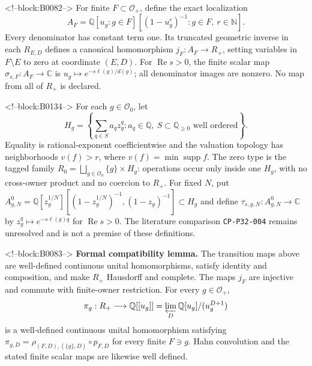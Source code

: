 \documentclass[11pt]{article}
\begin{document}
<!--block:B0082-->
For finite \(F\subset\mathcal O_+\), define the exact localization
\[
 A_F=\mathbb Q[u_g:g\in F]
 [(1-u_g^r)^{-1}:g\in F,\ r\in\mathbb N].
\]
Every denominator has constant term one.  Its truncated geometric inverse in
each \(R_{E,D}\) defines a canonical homomorphism \(j_F:A_F\to R_+\), setting
variables in \(F\setminus E\) to zero at coordinate \((E,D)\).  For
\(\operatorname{Re}s>0\), the finite scalar map
\(\sigma_{s,F}:A_F\to\mathbb C\) is
\(u_g\mapsto e^{-s\ell(g)/d(g)}\); all denominator images are nonzero.  No map
from all of \(R_+\) is declared.

<!--block:B0134-->
For each \(g\in\mathcal O_0\), let
\[
 H_g=\left\{\sum_{q\in S}a_qz_g^q:a_q\in\mathbb Q,
 \ S\subset\mathbb Q_{\geq0}\text{ well ordered}\right\}.
\]
Equality is rational-exponent coefficientwise and the valuation topology has
neighborhoods \(v(f)>r\), where \(v(f)=\min\operatorname{supp}f\).
The zero type is the tagged family
\(R_0=\bigsqcup_{g\in\mathcal O_0}\{g\}\times H_g\): operations occur only
inside one \(H_g\), with no cross-owner product and no coercion to \(R_+\).
For fixed \(N\), put
\(A^0_{g,N}=\mathbb Q[z_g^{1/N}]
[(1-z_g^{1/N})^{-1},(1-z_g)^{-1}]\subset H_g\) and define
\(\tau_{s,g,N}:A^0_{g,N}\to\mathbb C\) by
\(z_g^q\mapsto e^{-s\ell(g)q}\) for \(\operatorname{Re}s>0\).  The
literature comparison
\texttt{CP-P32-004} remains unresolved and is not a premise of these definitions.

<!--block:B0083-->
\textbf{Formal compatibility lemma.}  The transition maps above are
well-defined continuous unital homomorphisms, satisfy identity and composition,
and make \(R_+\) Hausdorff and complete.  The maps \(j_F\) are injective and
commute with finite-owner restriction.  For every \(g\in\mathcal O_+\),
\[
 \pi_g:R_+\longrightarrow
 \mathbb Q[[u_g]]=\varprojlim_D\mathbb Q[u_g]/(u_g^{D+1})
\]
is a well-defined continuous unital homomorphism satisfying
\(\pi_{g,D}=\rho_{(F,D),(\{g\},D)}\circ p_{F,D}\) for every finite
\(F\ni g\).  Hahn convolution and the stated finite scalar maps are likewise
well defined.
\end{document}
